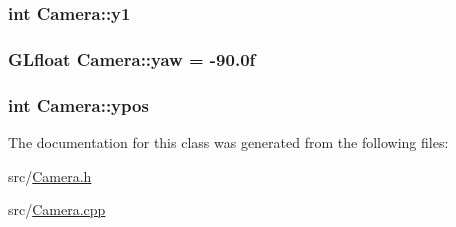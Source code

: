 \subsubsection[{y1}]{\setlength{\rightskip}{0pt plus 5cm}int Camera\+::y1}\label{class_camera_a54e3acc8db5fb8faf8757f93bedd7a32}
\hypertarget{class_camera_a2062d85e03c0fa14d5e13f3dc74c5d95}{}
\subsubsection[{yaw}]{\setlength{\rightskip}{0pt plus 5cm}G\+Lfloat Camera\+::yaw = -\/90.\+0f}\label{class_camera_a2062d85e03c0fa14d5e13f3dc74c5d95}
\hypertarget{class_camera_a29db8762c5a7b2b9a7ffd2a31b9ffb8e}{}
\subsubsection[{ypos}]{\setlength{\rightskip}{0pt plus 5cm}int Camera\+::ypos}\label{class_camera_a29db8762c5a7b2b9a7ffd2a31b9ffb8e}


The documentation for this class was generated from the following files\+:\begin{DoxyCompactItemize}
\item 
src/\hyperlink{_camera_8h}{Camera.\+h}\item 
src/\hyperlink{_camera_8cpp}{Camera.\+cpp}\end{DoxyCompactItemize}
